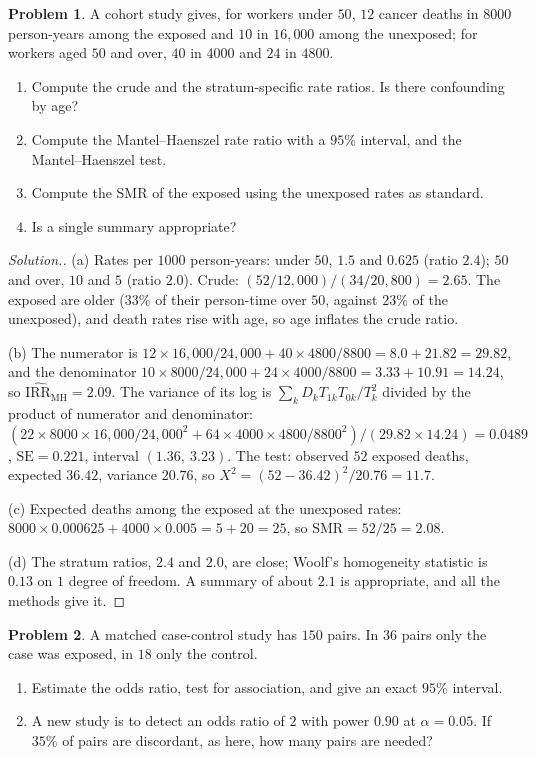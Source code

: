 \documentclass[11pt,a4paper]{article}
\numberwithin{equation}{section}
\theoremstyle{definition}
\newtheorem{problemx}{Problem}[subsection]
\newenvironment{problem}{\begin{problemx}}{\end{problemx}}
\newenvironment{solution}
  {\renewcommand{\qedsymbol}{}\begin{proof}[\textit{Solution}.]}
  {\end{proof}}
\begin{document}
\begin{problem}
\label{prob:revcohort}
A cohort study gives, for workers under $50$, $12$ cancer deaths in $8000$ person-years among the exposed and $10$ in $16{,}000$ among the unexposed;
for workers aged $50$ and over, $40$ in $4000$ and $24$ in $4800$.
\begin{enumerate}[label=(\alph*)]
\item Compute the crude and the stratum-specific rate ratios. Is there confounding by age?
\item Compute the Mantel--Haenszel rate ratio with a $95\%$ interval, and the Mantel--Haenszel test.
\item Compute the SMR of the exposed using the unexposed rates as standard.
\item Is a single summary appropriate?
\end{enumerate}
\end{problem}

\begin{solution}
(a) Rates per $1000$ person-years: under $50$, $1.5$ and $0.625$ (ratio $2.4$); $50$ and over, $10$ and $5$ (ratio $2.0$). Crude: $(52/12{,}000)/(34/20{,}800) = 2.65$. The exposed
are older ($33\%$ of their person-time over $50$, against $23\%$ of the unexposed), and death rates rise with age, so age inflates the crude ratio.

(b) The numerator is $12 \times 16{,}000/24{,}000 + 40 \times 4800/8800 = 8.0 + 21.82 = 29.82$, and the denominator $10 \times 8000/24{,}000 + 24 \times 4000/8800 = 3.33 + 10.91 = 14.24$,
so $\widehat{\text{IRR}}_{\text{MH}} = 2.09$. The variance of its log is $\sum_k D_k T_{1k}T_{0k}/T_k^2$ divided by the product of numerator and denominator: $(22 \times 8000 \times 16{,}000/24{,}000^2 + 64 \times 4000 \times 4800/8800^2)/(29.82 \times 14.24) = 0.0489$,
$\text{SE} = 0.221$, interval $(1.36,\ 3.23)$. The test: observed $52$ exposed deaths, expected $36.42$, variance $20.76$, so $X^2 = (52 - 36.42)^2/20.76 = 11.7$.

(c) Expected deaths among the exposed at the unexposed rates: $8000 \times 0.000625 + 4000 \times 0.005 = 5 + 20 = 25$, so $\text{SMR} = 52/25 = 2.08$.

(d) The stratum ratios, $2.4$ and $2.0$, are close; Woolf's homogeneity statistic is $0.13$ on $1$ degree of freedom. A summary of about $2.1$ is appropriate, and
all the methods give it.
\end{solution}

\begin{problem}
A matched case-control study has $150$ pairs. In $36$ pairs only the case was exposed, in $18$ only the control.
\begin{enumerate}[label=(\alph*)]
\item Estimate the odds ratio, test for association, and give an exact $95\%$ interval.
\item A new study is to detect an odds ratio of $2$ with power $0.90$ at $\alpha = 0.05$. If $35\%$ of pairs are discordant, as here, how many pairs are needed?
\end{enumerate}
\end{problem}
\end{document}
